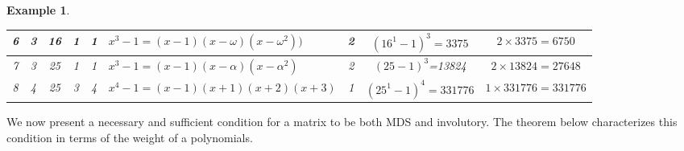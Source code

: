 \documentclass[12pt]{article}
\newtheorem{example}{Example}
\begin{document}
\begin{example}
\begin{table}[ht]
{\begin{tabular}{|c|c|c|c|c|l|c|c|c|}
		6&3 & 16 & 1 & 1 & \(x^3 - 1 = (x-1)(x - \omega)(x-\omega^2))\)                  & 2 & \((16^1-1)^3 = 3375\) & \(2 \times 3375 = 6750\) \\ \hline
		
	
		
		7&3 & 25 & 1 & 1 & \(x^3 - 1 = (x-1)(x-\alpha)(x-\alpha^2)\)                  & 2 & $(25-1)^3$=13824 & \(2 \times 13824 = 27648\) \\ \hline
		
		8&4 & 25 & 3 & 4 & \(x^4 - 1 = (x-1)(x+1)(x+2)(x+3)\)                  & 1 & \((25^1-1)^4=331776\) & \(1 \times 331776 = 331776\) \\ \hline
		
	
		
	\end{tabular}}
\end{table}

\end{example}
We now present a necessary and sufficient condition for a  matrix to be both MDS and involutory. The theorem below characterizes this condition in terms of the weight of a polynomials.
\end{document}
